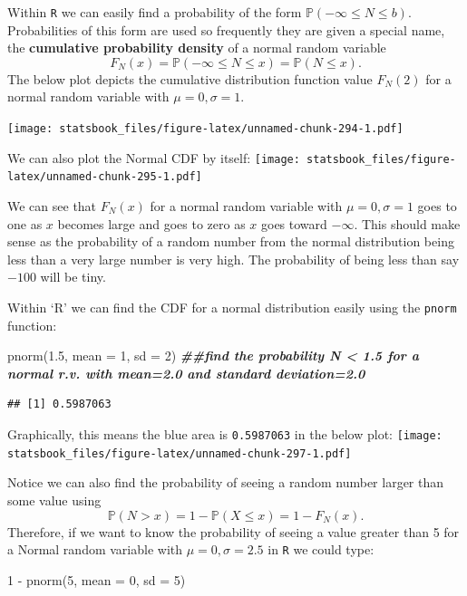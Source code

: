 \documentclass[
]{book}
\newenvironment{Shaded}{\begin{snugshade}}{\end{snugshade}}
\newcommand{\AttributeTok}[1]{\textcolor[rgb]{0.77,0.63,0.00}{#1}}
\newcommand{\DecValTok}[1]{\textcolor[rgb]{0.00,0.00,0.81}{#1}}
\newcommand{\DocumentationTok}[1]{\textcolor[rgb]{0.56,0.35,0.01}{\textbf{\textit{#1}}}}
\newcommand{\FloatTok}[1]{\textcolor[rgb]{0.00,0.00,0.81}{#1}}
\newcommand{\FunctionTok}[1]{\textcolor[rgb]{0.00,0.00,0.00}{#1}}
\newcommand{\NormalTok}[1]{#1}
\newcommand{\SpecialCharTok}[1]{\textcolor[rgb]{0.00,0.00,0.00}{#1}}
\theoremstyle{definition}
\theoremstyle{definition}
\theoremstyle{definition}
\theoremstyle{definition}
\theoremstyle{remark}
\begin{document}
Within \texttt{R} we can easily find a probability of the form \(\mathbb{P}(-\infty \leq N \leq b)\). Probabilities of this form are used so frequently they are given a special name, the \textbf{cumulative probability density} of a normal random variable \[F_N(x)=\mathbb{P}(-\infty \leq N \leq x)=\mathbb{P}(N \leq x).\] The below plot depicts the cumulative distribution function value \(F_N(2)\) for a normal random variable with \(\mu=0, \sigma=1\).

\texttt{[image: statsbook\_files/figure-latex/unnamed-chunk-294-1.pdf]}

We can also plot the Normal CDF by itself:
\texttt{[image: statsbook\_files/figure-latex/unnamed-chunk-295-1.pdf]}

We can see that \(F_N(x)\) for a normal random variable with \(\mu=0, \sigma=1\) goes to one as \(x\) becomes large and goes to zero as \(x\) goes toward \(-\infty\). This should make sense as the probability of a random number from the normal distribution being less than a very large number is very high. The probability of being less than say \(-100\) will be tiny.

Within `R' we can find the CDF for a normal distribution easily using the \texttt{pnorm} function:

\begin{Shaded}
\begin{Highlighting}[]
\FunctionTok{pnorm}\NormalTok{(}\FloatTok{1.5}\NormalTok{, }\AttributeTok{mean =} \DecValTok{1}\NormalTok{, }\AttributeTok{sd =} \DecValTok{2}\NormalTok{)  }\DocumentationTok{\#\#find the probability N \textless{} 1.5 for a normal r.v. with mean=2.0 and standard deviation=2.0}
\end{Highlighting}
\end{Shaded}

\begin{verbatim}
## [1] 0.5987063
\end{verbatim}

Graphically, this means the blue area is \texttt{0.5987063} in the below plot:
\texttt{[image: statsbook\_files/figure-latex/unnamed-chunk-297-1.pdf]}

Notice we can also find the probability of seeing a random number larger than some value using \[\mathbb{P}(N>x)=1-\mathbb{P}(X\leq x)=1-F_N(x).\] Therefore, if we want to know the probability of seeing a value greater than 5 for a Normal random variable with \(\mu=0, \sigma=2.5\) in \texttt{R} we could type:

\begin{Shaded}
\begin{Highlighting}[]
\DecValTok{1} \SpecialCharTok{{-}} \FunctionTok{pnorm}\NormalTok{(}\DecValTok{5}\NormalTok{, }\AttributeTok{mean =} \DecValTok{0}\NormalTok{, }\AttributeTok{sd =} \DecValTok{5}\NormalTok{)}
\end{Highlighting}
\end{Shaded}
\end{document}

